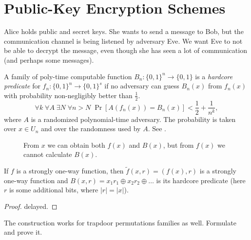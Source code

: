 
\section{Public-Key Encryption Schemes}

Alice holds public and secret keys.
She wants to send a message to Bob, but the communication channel is being listened by adversary Eve.
We want Eve to not be able to decrypt the message, even though she has seen a lot of communication (and perhaps some messages).

\begin{definition}
	A family of poly-time computable function $B_n \colon \{0, 1\}^n \to \{0, 1\}$ is a \emph{hardcore predicate} for  $f_n \colon \{0, 1\}^n \to \{0, 1\}^s$ if no adversary can guess $B_n(x)$ from  $f_n(x)$ with probability non-negligibly better than  $\frac{1}{2}$.
	\[
		\forall k \; \forall A \; \exists N \; \forall n > N \; \Pr[A(f_n(x)) = B_n(x)] < \frac{1}{2} + \frac{1}{n^{k}},
	\] where $A$ is a randomized polynomial-time adversary.
	The probability is taken over  $x \in U_n$ and over the randomness used by  $A$.
	See .
\begin{figure}[H]
	\centering
{}
	\caption{From $x$ we can obtain both  $f(x)$ and $B(x)$, but from  $f(x)$ we cannot calculate  $B(x)$.}
	\label{fig:hardcore_predicate}
\end{figure}
\end{definition}

\begin{theorem} \label{thm:goldreich_levin}
  If $f$ is a strongly one-way function, then  $\tilde f(x, r) = (f(x), r)$ is a strongly one-way function and  $B(x, r) = x_1 r_1 \oplus x_2r_2 \oplus \dots$ is its hardcore predicate (here $r$ is some additional bits, where $|r| = |x|$).
\end{theorem}
\begin{proof}
  delayed.
\end{proof}
\begin{exercise}
  The construction works for trapdoor permutations families as well.
  Formulate and prove it.
\end{exercise}


